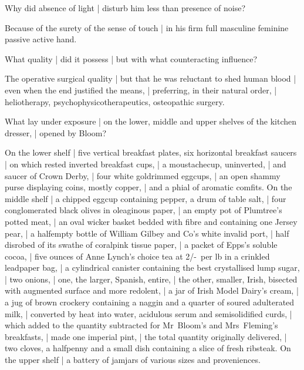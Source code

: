 Why did absence of light |
disturb him less than presence of noise?

\Memories
Because of the surety of the sense of touch |
in his firm full masculine feminine passive active hand.%


What quality |
did it
possess |
but with what counteracting influence?

\Memories
The operative surgical quality |
but that he was reluctant to shed human blood |
even when the end justified the means, |
preferring, in their natural order, |
heliotherapy, psychophysicotherapeutics, osteopathic surgery.



What lay under exposure |
on the lower, middle and upper shelves of the kitchen dresser, |
opened by Bloom?

\Household
On the lower shelf |
five vertical breakfast plates, six horizontal breakfast saucers |
on which rested inverted breakfast cups, |
a moustachecup, uninverted, |
and saucer of Crown Derby, |
four white goldrimmed eggcups, |
an open shammy purse displaying coins, mostly copper, |
and a phial of aromatic
comfits.
On the middle shelf |
a chipped eggcup containing pepper, a drum of table salt, |
four conglomerated black olives in oleaginous paper, |
an empty pot of Plumtree's potted meat, |
an oval wicker basket bedded with fibre and containing one Jersey pear, |
a halfempty bottle of William Gilbey and Co's white invalid port, |
half disrobed of its swathe of coralpink tissue paper, |
a packet of Epps's soluble cocoa, |
five ounces of Anne Lynch's choice tea at 2/-~per lb in a crinkled leadpaper bag, |
a cylindrical canister containing the best crystallised lump sugar, |
two onions, |
one, the larger, Spanish, entire, |
the other, smaller, Irish, bisected with augmented surface and more redolent, |
a jar of Irish Model Dairy's cream, |
a jug of brown crockery containing a naggin and a quarter
of soured adulterated milk, |
converted by heat into water, acidulous serum and semisolidified curds, |
which added to the quantity subtracted for Mr~Bloom's and Mrs~Fleming's breakfasts, |
made one imperial pint, |
the total quantity originally delivered, |
two cloves,
a halfpenny
and a small dish containing a slice of fresh ribsteak.
On the upper shelf |
a battery of jamjars
of various sizes and proveniences.



